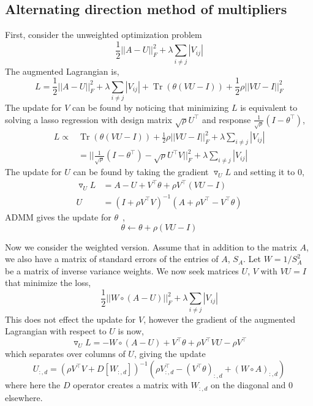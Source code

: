 \documentclass{article}
\DeclareMathOperator{\Tr}{Tr}
\begin{document}
\subsection*{Alternating direction method of multipliers}\label{note}
First, consider the unweighted optimization problem
\begin{equation}
\frac{1}{2} ||A - U||_F^2 + \lambda \sum_{i\neq j}|V_{ij}|
\end{equation}
The augmented Lagrangian is,
\begin{equation*}
L = \frac{1}{2} ||A - U||_F^2 +
   \lambda \sum_{i\neq j}|V_{ij}| +
   \Tr(\theta(VU-I)) + 
   \frac{1}{2} \rho ||VU-I||_F^2
\end{equation*}
The update for $V$ can be found by noticing that minimizing $L$ is equivalent
to solving a lasso regression with design matrix $\sqrt{\rho} U^\top$ and
response $\frac{1}{\sqrt{\rho}}(I-\theta^\top)$,
\begin{align*}
   L \propto& \Tr(\theta(VU-I)) + 
     \frac{1}{2} \rho ||VU-I||_F^2 + \lambda \sum_{i\neq j}|V_{ij}| \\
   &= ||\frac{1}{\sqrt{\rho}}(I-\theta^\top) -
      \sqrt{\rho} U^\top V||_F^2 + \lambda \sum_{i\neq j}|V_{ij}|
\end{align*}
The update for $U$ can be found by taking the gradient $\triangledown_U L$
and setting it to 0,
\begin{align*}
\triangledown_U L &= A - U + V^\top \theta + \rho V^\top(VU-I) \\
U &= (I + \rho V^{\top} V)^{-1}(A + \rho V^\top - V^\top \theta)
\end{align*}
ADMM gives the update for $\theta$~\cite{Boyd2010},
\begin{equation}
\theta \leftarrow \theta + \rho(VU-I)
\end{equation}

Now we consider the weighted version. Assume that in addition to the matrix $A$, we
also have a matrix of standard errors of the entries of $A$, $S_A$. Let
$W = 1/S_A^2$ be a matrix of inverse variance weights. We now
seek matrices $U$, $V$ with $VU=I$ that minimize the loss,
\begin{equation}\label{opt_weights}
\frac{1}{2} || W \circ (A - U)||_F^2 + \lambda \sum_{i\neq j}|V_{ij}|
\end{equation}
This does not effect the update for $V$, however the gradient of the augmented
Lagrangian with respect to $U$ is now,
\begin{equation*}
\triangledown_U L = - W \circ (A- U) + V^\top \theta + \rho V^\top V U - \rho V^\top
\end{equation*}
which separates over columns of $U$, giving the update
\begin{equation}
U_{:, d} = (\rho V^\top V + D[W_{:, d}])^{-1}(\rho V^\top_{:, d} -
  (V^\top \theta)_{:, d} + (W \circ A)_{:, d})
\end{equation}
where here the $D$ operator creates a matrix with $W_{:, d}$ on the
diagonal and 0 elsewhere.
\end{document}
